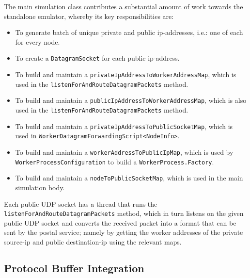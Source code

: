 The main simulation class contributes a substantial amount of work towards the standalone emulator, whereby its key
responsibilities are:
\begin{itemize}
    \item To generate batch of unique private and public ip-addresses, i.e.: one of each for every node.
    \item To create a \texttt{DatagramSocket}\cite{java_DatagramSocket} for each public ip-address.
    \item To build and maintain a \texttt{privateIpAddressToWorkerAddressMap}, which is used in the
    \texttt{listenForAndRouteDatagramPackets} method.
    \item To build and maintain a \texttt{publicIpAddressToWorkerAddressMap}, which is also used in the
    \texttt{listenForAndRouteDatagramPackets} method.
    \item To build and maintain a \texttt{privateIpAddressToPublicSocketMap}, which is used in
    \texttt{WorkerDatagramForwardingScript<NodeInfo>}.
    \item To build and maintain a \texttt{workerAddressToPublicIpMap}, which is used by
    \texttt{WorkerProcessConfiguration} to build a \texttt{WorkerProcess.Factory}.
    \item To build and maintain a \texttt{nodeToPublicSocketMap}, which is used in the main simulation body.
\end{itemize}

Each public UDP socket has a thread that runs the \texttt{listenForAndRouteDatagramPackets} method, which in turn
listens on the given public UDP socket and converts the received packet into a format that can be sent by the postal
service; namely by getting the worker addresses of the private source-ip and public destination-ip using the relevant
maps.

\subsection{Protocol Buffer Integration}\label{subsection:protocol_buffer_integration}

